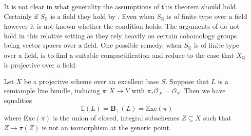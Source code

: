 \documentclass[a4paper,12pt]{book}
\newcommand{\BS}{\mathbf{B}_{+}}
\newcommand{\ox}{\mathcal{O}_{X}}
\begin{document}
\begin{remark}
	It is not clear in what generality the assumptions of this theorem should hold. Certainly if $S_{\mathbb{Q}}$ is a field they hold by \cite{birkar2017augmented}. Even when $S_{\mathbb{Q}}$ is of finite type over a field however it is not known whether the condition holds. The arguments of \cite{birkar2017augmented} do not hold in this relative setting as they rely heavily on certain cohomology groups being vector spaces over a field. One possible remedy, when $S_{\mathbb{Q}}$ is of finite type over a field, is to find a suitable compactification and reduce to the case that $X_{\mathbb{Q}}$ is projective over a field.
\end{remark}


\begin{lemma}\label{Case:SA}
	Let $X$ be a projective scheme over an excellent base $S$. Suppose that $L$ is a semiample line bundle, inducing $\pi:X \to Y$ with $\pi_{*}\ox=\mathcal{O}_{Y}$. Then we have equalities \[\mathbb{E}(L)=\BS(L)=\text{Exc}(\pi)\]
	where $\text{Exc}(\pi)$ is the union of closed, integral subschemes $Z \subseteq X$ such that $Z \to \pi(Z)$ is not an isomorphism at the generic point.
\end{lemma}
\end{document}
